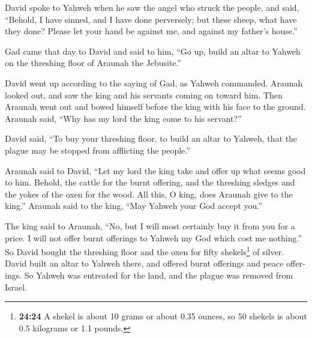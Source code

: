 \begin{paracol}{2}
\begin{otherlanguage}{english}
 David spoke to Yahweh when he saw the angel who struck
the people, and said, ``Behold, I have sinned, and I have done
perversely; but these sheep, what have they done? Please let your hand
be against me, and against my father's house.''

 Gad came that day to David and said to him, ``Go up,
build an altar to Yahweh on the threshing floor of Araunah the
Jebusite.''

 David went up according to the saying of Gad, as Yahweh
commanded.  Araunah looked out, and saw the king and his
servants coming on toward him. Then Araunah went out and bowed himself
before the king with his face to the ground.  Araunah
said, ``Why has my lord the king come to his servant?''

David said, ``To buy your threshing floor, to build an altar to Yahweh,
that the plague may be stopped from afflicting the people.''

 Araunah said to David, ``Let my lord the king take and
offer up what seems good to him. Behold, the cattle for the burnt
offering, and the threshing sledges and the yokes of the oxen for the
wood.  All this, O king, does Araunah give to the king.''
Araunah said to the king, ``May Yahweh your God accept you.''

 The king said to Araunah, ``No, but I will most
certainly buy it from you for a price. I will not offer burnt offerings
to Yahweh my God which cost me nothing.'' So David bought the threshing
floor and the oxen for fifty shekels\footnote{\textbf{24:24} A shekel is
  about 10 grams or about 0.35 ounces, so 50 shekels is about 0.5
  kilograms or 1.1 pounds.} of silver.  David built an
altar to Yahweh there, and offered burnt offerings and peace offerings.
So Yahweh was entreated for the land, and the plague was removed from
Israel. \end{otherlanguage} \end{paracol}
